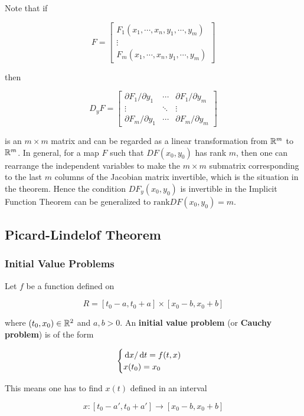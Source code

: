 \documentclass[a4paper,12pt]{article}
\begin{document}
Note that if

$$F=\begin{bmatrix}
  F_{1}(x_{1},\cdots,x_{n},y_{1},\cdots,y_{m})\\
  \vdots\\
  F_{m}(x_{1},\cdots,x_{n},y_{1},\cdots,y_{m})
\end{bmatrix}$$\s

then

$$D_{y}F=\begin{bmatrix}
  \partial F_{1}/\partial y_{1} & \cdots & \partial F_{1}/\partial y_{m}\\
  \vdots & \ddots & \vdots\\
  \partial F_{m}/\partial y_{1} & \cdots & \partial F_{m}/\partial y_{m}
\end{bmatrix}$$\s

is an $m\times m$ matrix and can be regarded as a linear transformation from $\mathbb{R}^{m}$ to $\mathbb{R}^{m}$. In general, for a map $F$ such that $DF(x_{0},y_{0})$ has rank $m$, then one can rearrange the independent variables to make the $m\times m$ submatrix corresponding to the last $m$ columns of the Jacobian matrix invertible, which is the situation in the theorem. Hence the condition $DF_{y}(x_{0},y_{0})$ is invertible in the Implicit Function Theorem can be generalized to $\mathrm{rank}DF(x_{0},y_{0})=m$.

\subsection{Picard-Lindelof Theorem}
\subsubsection{Initial Value Problems}
\begin{dft}
  Let $f$ be a function defined on

$$R=[t_{0}-a,t_{0}+a]\times[x_{0}-b,x_{0}+b]$$\s

where $(t_{0},x_{0})\in\mathbb{R}^{2}$ and $a,b>0$. An \textbf{initial value problem} (or \textbf{Cauchy problem}) is of the form

$$\begin{cases}
  \,\mathrm{d} x/\,\mathrm{d} t=f(t,x)\\
  x(t_{0})=x_{0}
\end{cases}$$
\end{dft}\n

This means one has to find $x(t)$ defined in an interval

$$x:[t_{0}-a',t_{0}+a']\to[x_{0}-b,x_{0}+b]$$\s
\end{document}
